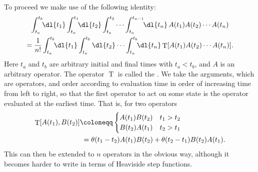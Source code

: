 \documentclass[fleqn]{NotesClass}
\newcommand{\heaviside}{\theta}
\DeclareMathOperator{\timeOrdering}{T}
\begin{document}
    To proceed we make use of the following identity:
    \begin{multline}
        \int_{t_a}^{t_b} \!\! \dl{t_1} \int_{t_a}^{t_1} \!\! \dl{t_2} \int_{t_a}^{t_2} \dotsm \int_{t_a}^{t_{n-1}} \!\! \dl{t_n} \, A(t_1)A(t_2) \dotsb A(t_n)\\
        = \frac{1}{n!} \int_{t_a}^{t_b} \!\! \dl{t_1} \int_{t_a}^{t_b} \dl{t_2} \dotsm \int_{t_a}^{t_b} \!\! \dl{t_n} \timeOrdering[A(t_1)A(t_2) \dotsm A(t_n)].
    \end{multline}
    Here \(t_a\) and \(t_b\) are arbitrary initial and final times with \(t_a < t_b\), and \(A\) is an arbitrary operator.
    The operator \(\timeOrdering\) is called the .
    We take the arguments, which are operators, and order according to evaluation time in order of increasing time from left to right, so that the first operator to act on some state is the operator evaluated at the earliest time.
    That is, for two operators
    \begin{align}
        \timeOrdering[A(t_1), B(t_2)] &\coloneqq
        \begin{cases}
            A(t_1)B(t_2) & t_1 > t_2\\
            B(t_2)A(t_1) & t_2 > t_1
        \end{cases}
        \\
        &\hphantom{:}= \heaviside(t_1 - t_2) A(t_1)B(t_2) + \heaviside(t_2 - t_1) B(t_2)A(t_1).
    \end{align}
    This can then be extended to \(n\) operators in the obvious way, although it becomes harder to write in terms of Heaviside step functions.
    
\end{document}
